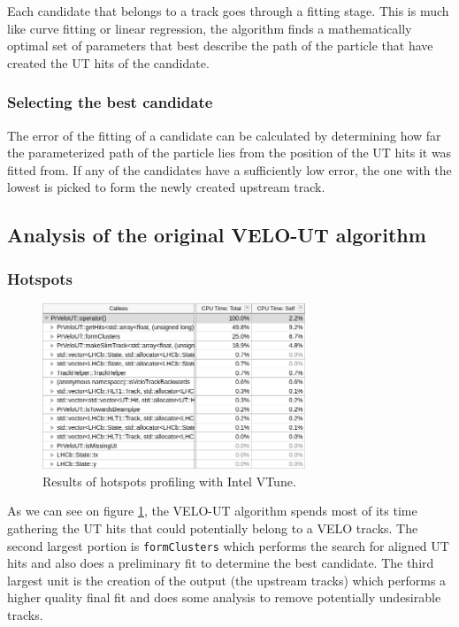 \documentclass[12pt]{article}
\newcommand{\code}[1]{\texttt{#1}}
\begin{document}
Each candidate that belongs to a track goes through a fitting stage. This is much like curve fitting or linear regression, the algorithm finds a mathematically optimal set of parameters that best describe the path of the particle that have created the UT hits of the candidate. 


\subsubsection{Selecting the best candidate}

The error of the fitting of a candidate can be calculated by determining how far the parameterized path of the particle lies from the position of the UT hits it was fitted from. If any of the candidates have a sufficiently low error, the one with the lowest is picked to form the newly created upstream track.


\subsection{Analysis of the original VELO-UT algorithm}

\subsubsection{Hotspots}

\begin{figure}[H]
	\begin{center}
		\includegraphics[width=0.7\textwidth]{velout_hotspots_orig}
	\end{center}
	\caption[CPU hotspots of the unoptimized VELO-UT algorithm]{Results of hotspots profiling with Intel VTune.}
	\label{fig_velout_hotspots_orig}
\end{figure}

As we can see on figure \ref{fig_velout_hotspots_orig}, the VELO-UT algorithm spends most of its time gathering the UT hits that could potentially belong to a VELO tracks. The second largest portion is \code{formClusters} which performs the search for aligned UT hits and also does a preliminary fit to determine the best candidate. The third largest unit is the creation of the output (the upstream tracks) which performs a higher quality final fit and does some analysis to remove potentially undesirable tracks.
\end{document}
